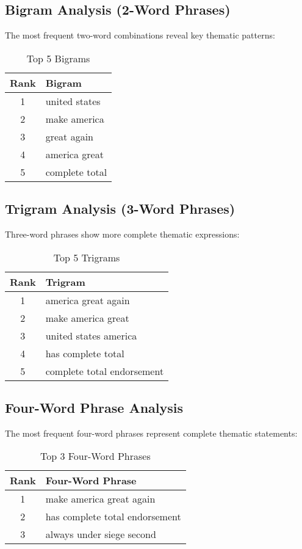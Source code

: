 \documentclass[12pt,a4paper]{article}
\begin{document}
\subsection{Bigram Analysis (2-Word Phrases)}

The most frequent two-word combinations reveal key thematic patterns:

\begin{table}[h!]
\centering
\caption{Top 5 Bigrams}
\begin{tabular}{@{}cl@{}}
\toprule
\textbf{Rank} & \textbf{Bigram} \\
\midrule
1 & united states \\
2 & make america \\
3 & great again \\
4 & america great \\
5 & complete total \\
\bottomrule
\end{tabular}
\end{table}

\subsection{Trigram Analysis (3-Word Phrases)}

Three-word phrases show more complete thematic expressions:

\begin{table}[h!]
\centering
\caption{Top 5 Trigrams}
\begin{tabular}{@{}cl@{}}
\toprule
\textbf{Rank} & \textbf{Trigram} \\
\midrule
1 & america great again \\
2 & make america great \\
3 & united states america \\
4 & has complete total \\
5 & complete total endorsement \\
\bottomrule
\end{tabular}
\end{table}

\subsection{Four-Word Phrase Analysis}

The most frequent four-word phrases represent complete thematic statements:

\begin{table}[h!]
\centering
\caption{Top 3 Four-Word Phrases}
\begin{tabular}{@{}cl@{}}
\toprule
\textbf{Rank} & \textbf{Four-Word Phrase} \\
\midrule
1 & make america great again \\
2 & has complete total endorsement \\
3 & always under siege second \\
\bottomrule
\end{tabular}
\end{table}
\end{document}
